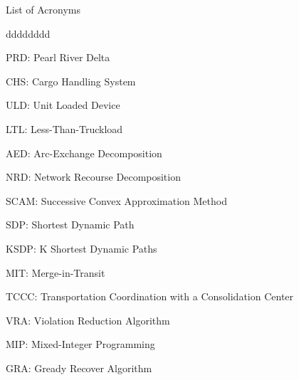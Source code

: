 \newpage
\begin{center}
{\Large {List of Acronyms}}
\end{center}
\vspace{4mm}

\begin{myDescription}{dddddddd}
    \item[PRD:] Pearl River Delta
    \item[CHS:] Cargo Handling System
    \item[ULD:] Unit Loaded Device
    \item[LTL:] Less-Than-Truckload
    \item[AED:]	Arc-Exchange Decomposition
    \item[NRD:] Network Recourse Decomposition
    \item[SCAM:] Successive Convex Approximation Method
    \item[SDP:] Shortest Dynamic Path
    \item[KSDP:] K Shortest Dynamic Paths
    \item[MIT:]	Merge-in-Transit
    \item[TCCC:] Transportation Coordination with a Consolidation Center
    \item[VRA:] Violation Reduction Algorithm
    \item[MIP:] Mixed-Integer Programming
    \item[GRA:] Gready Recover Algorithm
\end{myDescription}    
